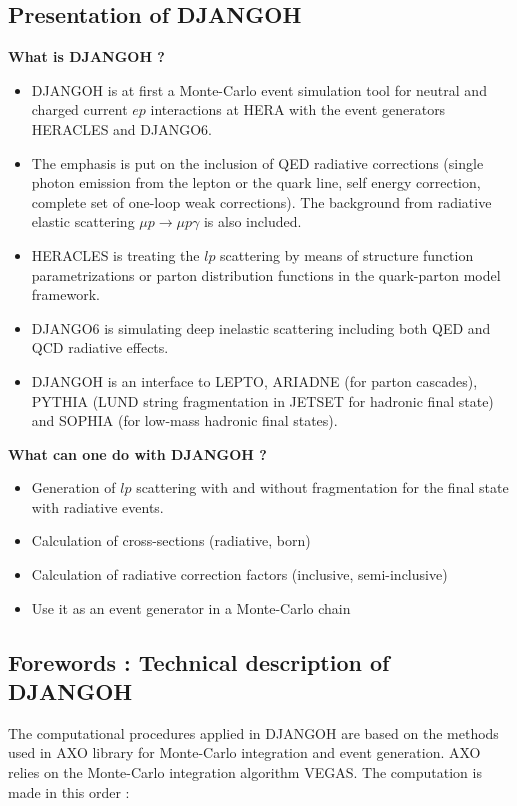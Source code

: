\documentclass[letterpaper,12pt]{article}
\begin{document}
\subsection{Presentation of DJANGOH}
\textbf{What is DJANGOH ?}
\begin{itemize}
\item DJANGOH\cite{DJANGOH} is at first a Monte-Carlo event simulation tool for neutral and charged current
$ep$ interactions at HERA with the event generators HERACLES and DJANGO6.
\item The emphasis is put on the inclusion of QED radiative corrections
(single photon emission from the lepton or the quark line, self energy correction, complete
set of one-loop weak corrections). The background from radiative elastic scattering
$\mu p\rightarrow \mu p\gamma$ is also included.
\item HERACLES is treating the $lp$ scattering by means of structure function parametrizations
or parton distribution functions in the quark-parton model framework.
\item DJANGO6 is simulating deep inelastic scattering including both QED and QCD radiative effects.
\item DJANGOH is an interface to LEPTO\cite{LEPTO}, ARIADNE\cite{ARIADNE} (for parton cascades), PYTHIA\cite{PYTHIA6} (LUND
string fragmentation in JETSET\cite{JETSET} for hadronic final state) and SOPHIA\cite{SOPHIA} (for low-mass
hadronic final states).
\end{itemize}
\textbf{What can one do with DJANGOH ?}
\begin{itemize}
\item Generation of $lp$ scattering with and without fragmentation for the final state with radiative events.
\item Calculation of cross-sections (radiative, born)
\item Calculation of radiative correction factors (inclusive, semi-inclusive)
\item Use it as an event generator in a Monte-Carlo chain
\end{itemize}

\subsection{Forewords : Technical description of DJANGOH}

The computational procedures applied in DJANGOH are based on the methods used in AXO\cite{AXO}
library for Monte-Carlo integration and event generation. AXO relies on the Monte-Carlo
integration algorithm VEGAS\cite{VEGAS}. The computation is made in this order :
\end{document}
